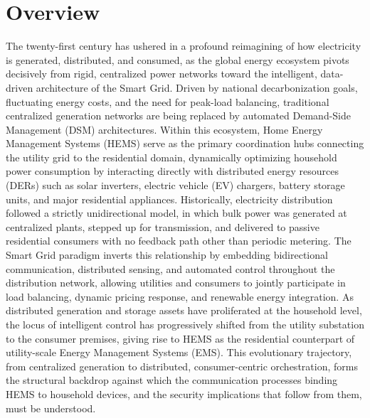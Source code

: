 \section{Overview}

The twenty-first century has ushered in a profound reimagining of how electricity is generated, distributed, and consumed, as the global energy ecosystem pivots decisively from rigid, centralized power networks toward the intelligent, data-driven architecture of the Smart Grid. Driven by national decarbonization goals, fluctuating energy costs, and the need for peak-load balancing, traditional centralized generation networks are being replaced by automated Demand-Side Management (DSM) architectures. Within this ecosystem, Home Energy Management Systems (HEMS) serve as the primary coordination hubs connecting the utility grid to the residential domain, dynamically optimizing household power consumption by interacting directly with distributed energy resources (DERs) such as solar inverters, electric vehicle (EV) chargers, battery storage units, and major residential appliances.
Historically, electricity distribution followed a strictly unidirectional model, in which bulk power was generated at centralized plants, stepped up for transmission, and delivered to passive residential consumers with no feedback path other than periodic metering. The Smart Grid paradigm inverts this relationship by embedding bidirectional communication, distributed sensing, and automated control throughout the distribution network, allowing utilities and consumers to jointly participate in load balancing, dynamic pricing response, and renewable energy integration. As distributed generation and storage assets have proliferated at the household level, the locus of intelligent control has progressively shifted from the utility substation to the consumer premises, giving rise to HEMS as the residential counterpart of utility-scale Energy Management Systems (EMS). This evolutionary trajectory, from centralized generation to distributed, consumer-centric orchestration, forms the structural backdrop against which the communication processes binding HEMS to household devices, and the security implications that follow from them, must be understood.
